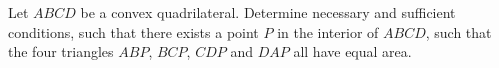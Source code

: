 Let $ABCD$ be a convex quadrilateral. Determine necessary and sufficient conditions, such 
that there exists a point $P$ in the interior of $ABCD$, such that the four triangles 
$ABP$, $BCP$, $CDP$ and $DAP$ all have equal area.